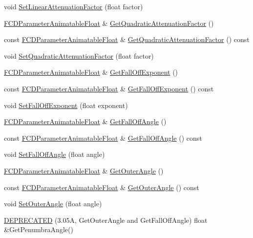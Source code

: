 \begin{DoxyCompactItemize}
\item 
void \hyperlink{classFCDLight_ac49add5d8113667515dbf732f54b074c}{SetLinearAttenuationFactor} (float factor)
\item 
\hyperlink{classFCDParameterAnimatableT}{FCDParameterAnimatableFloat} \& \hyperlink{classFCDLight_a3fdaf79fdbf70bd93d79c0bece5584c1}{GetQuadraticAttenuationFactor} ()
\item 
const \hyperlink{classFCDParameterAnimatableT}{FCDParameterAnimatableFloat} \& \hyperlink{classFCDLight_afb2a25f365919613c231f353a2058ca7}{GetQuadraticAttenuationFactor} () const 
\item 
void \hyperlink{classFCDLight_a2d399fdd6cb7acb438f4a928bed8990f}{SetQuadraticAttenuationFactor} (float factor)
\item 
\hyperlink{classFCDParameterAnimatableT}{FCDParameterAnimatableFloat} \& \hyperlink{classFCDLight_a1e02138df1878250de6522a1bc62241f}{GetFallOffExponent} ()
\item 
const \hyperlink{classFCDParameterAnimatableT}{FCDParameterAnimatableFloat} \& \hyperlink{classFCDLight_a1775321a4cf1fba59c3e4a87c8b48c16}{GetFallOffExponent} () const 
\item 
void \hyperlink{classFCDLight_a41ef012ce10d686bdd298e125523914c}{SetFallOffExponent} (float exponent)
\item 
\hyperlink{classFCDParameterAnimatableT}{FCDParameterAnimatableFloat} \& \hyperlink{classFCDLight_ac6eb92ada915ff9fad5011d3a5791d7e}{GetFallOffAngle} ()
\item 
const \hyperlink{classFCDParameterAnimatableT}{FCDParameterAnimatableFloat} \& \hyperlink{classFCDLight_a412b2e2c187cb38ab04a32cf313e8e96}{GetFallOffAngle} () const 
\item 
void \hyperlink{classFCDLight_af5ab71bc8463b42473a3d65d5f5a6f53}{SetFallOffAngle} (float angle)
\item 
\hyperlink{classFCDParameterAnimatableT}{FCDParameterAnimatableFloat} \& \hyperlink{classFCDLight_aad96306d544e03d49389617e4a1ec423}{GetOuterAngle} ()
\item 
const \hyperlink{classFCDParameterAnimatableT}{FCDParameterAnimatableFloat} \& \hyperlink{classFCDLight_a21063a50503cdc2c5ad9337b0e20fac0}{GetOuterAngle} () const 
\item 
void \hyperlink{classFCDLight_add7a7a1357b00dee19f0a2add3d21818}{SetOuterAngle} (float angle)
\item 
\hyperlink{classFCDLight_a127fc0c85f489c5087542cf0267593ab}{DEPRECATED} (3.05A, GetOuterAngle and GetFallOffAngle) float \&GetPenumbraAngle()

\end{DoxyCompactItemize}
